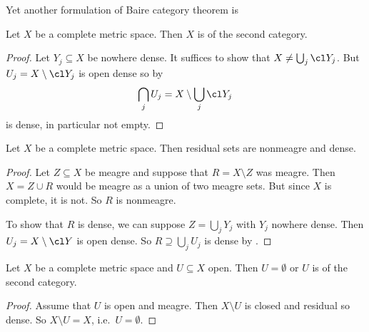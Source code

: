 \documentclass[a4paper]{article}
\begin{document}
Yet another formulation of Baire category theorem is

\begin{corollary}
  Let \(X\) be a complete metric space. Then \(X\) is of the second category.
\end{corollary}

\begin{proof}
  Let \(Y_j \subseteq X\) be nowhere dense. It suffices to show that \(X \neq \bigcup_j \cl Y_j\). But \(U_j = X \setminus \cl Y_j\) is open dense so by 
  \[
    \bigcap_j U_j = X \setminus \bigcup_j \cl Y_j
  \]
  is dense, in particular not empty.
\end{proof}

\begin{corollary}
  Let \(X\) be a complete metric space. Then residual sets are nonmeagre and dense.
\end{corollary}

\begin{proof}
  Let \(Z \subseteq X\) be meagre and suppose that \(R = X \setminus Z\) was meagre. Then \(X = Z \cup R\) would be meagre as a union of two meagre sets. But since \(X\) is complete, it is not. So \(R\) is nonmeagre.

  To show that \(R\) is dense, we can suppose \(Z = \bigcup_j Y_j\) with \(Y_j\) nowhere dense. Then \(U_j = X \setminus \cl Y\) is open dense. So \(R \supseteq \bigcup_j U_j\) is dense by .
\end{proof}

\begin{corollary}
  Let \(X\) be a complete metric space and \(U \subseteq X\) open. Then \(U = \emptyset\) or \(U\) is of the second category.
\end{corollary}

\begin{proof}
  Assume that \(U\) is open and meagre. Then \(X \setminus U\) is closed and residual so dense. So \(X \setminus U = X\), i.e.\ \(U = \emptyset\).
\end{proof}








\printindex
\end{document}
